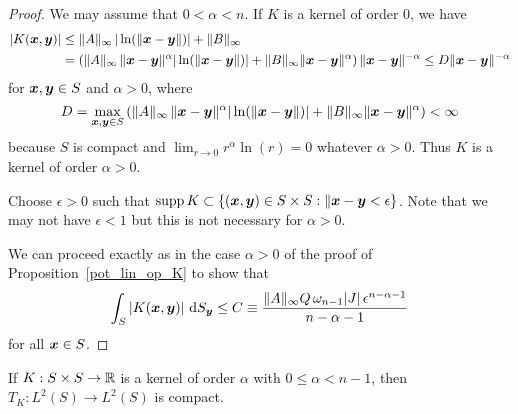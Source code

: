 \begin{proof}
We may assume that $0<\alpha < n$.  If $K$ is a kernel of order
$0$, we have
\begin{align*}
|K({\bm{x}},{\bm{y}})| &\leq \|A\|_\infty \,
|\ln(\|{\bm{x}}-{\bm{y}}\|)| + \|B\|_\infty \\
&= \left( \|A\|_\infty \,\|{\bm{x}}-{\bm{y}}\|^\alpha
|\ln(\|{\bm{x}}-{\bm{y}}\|)| + \|B\|_\infty \|{\bm{x}}-{\bm{y}}\|^\alpha \right)
\|{\bm{x}}-{\bm{y}}\|^{-\alpha}
\leq D \|{\bm{x}}-{\bm{y}}\|^{-\alpha}
\end{align*}
for ${\bm{x}},{\bm{y}} \in S$ and $\alpha >0$, where
\[
D = \max_{{\bm{x}},{\bm{y}}\in S} \left( \|A\|_\infty
\,\|{\bm{x}}-{\bm{y}}\|^\alpha |\ln(\|{\bm{x}}-{\bm{y}}\|)| +
\|B\|_\infty \|{\bm{x}}-{\bm{y}}\|^\alpha \right) < \infty
\]
because $S$ is compact and
$\displaystyle \lim_{r\rightarrow 0} r^\alpha \ln(r)=0$ whatever $\alpha>0$.
Thus $K$ is a kernel of order $\alpha>0$.

Choose $\epsilon >0$ such that $\operatorname{supp} K \subset 
\{ ({\bm{x}},{\bm{y}}) \in S \times S : \|{\bm{x}} - {\bm{y}} < \epsilon \}$.
Note that we may not have $\epsilon <1$ but this is not necessary for
$\alpha >0$.

We can proceed exactly as in the case $\alpha >0$ of the proof of
Proposition~\ref{pot_lin_op_K} to show that
\[
\int_S \left| K({\bm{x}},{\bm{y}}) \right| \,\mathrm{d}{S}_{{\bm{y}}}
\leq C \equiv
\frac{\|A\|_\infty Q\, \omega_{n-1} |J|\, \epsilon^{n-\alpha-1}}{n-\alpha-1}
\]
for all ${\bm{x}} \in S$.
\end{proof}

\begin{prop} \label{pot_K_LtwoComp}
If $K:S\times S \rightarrow \mathbb{R}$ is a kernel of order $\alpha$ with
$0\leq \alpha < n -1$, then $\displaystyle T_K: L^2(S) \rightarrow L^2(S)$ is
compact.
\end{prop}

